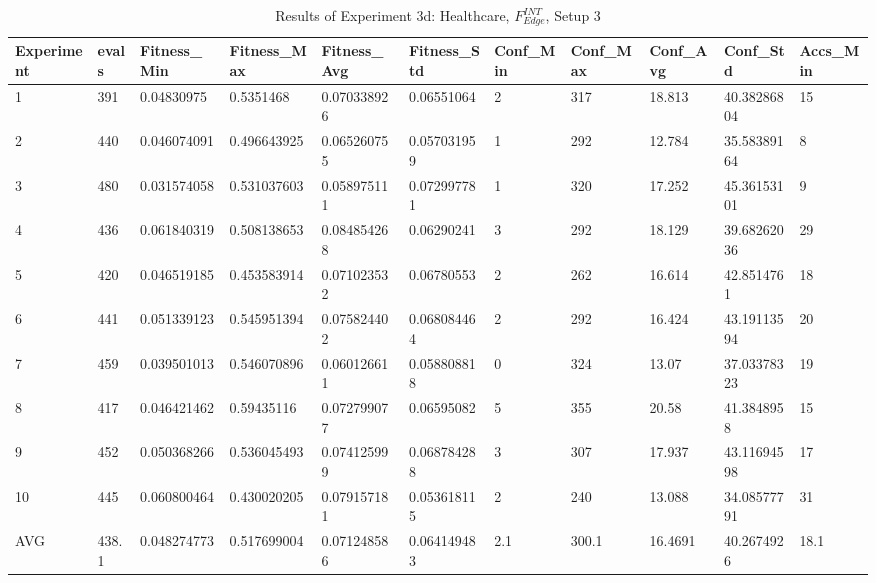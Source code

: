 		\begin{table}[H]
			\caption{Results of Experiment 3d: Healthcare, $F_{Edge}^{INT}$, Setup 3}
			\label{tab:A_Exp3d_Data}
			\begin{adjustbox}{max width=380pt,keepaspectratio,angle=90}
				\begin{tabular}{|l|l|l|l|l|l|l|l|l|l|l|}
					\hline
					\rowcolor[HTML]{EFEFEF} 
					Experiment & evals & Fitness\_Min & Fitness\_Max & Fitness\_Avg & Fitness\_Std & Conf\_Min & Conf\_Max & Conf\_Avg & Conf\_Std   & Accs\_Min \\ \hline
					1          & 391   & 0.04830975   & 0.5351468    & 0.070338926  & 0.06551064   & 2         & 317       & 18.813    & 40.38286804 & 15        \\ \hline
					2          & 440   & 0.046074091  & 0.496643925  & 0.065260755  & 0.057031959  & 1         & 292       & 12.784    & 35.58389164 & 8         \\ \hline
					3          & 480   & 0.031574058  & 0.531037603  & 0.058975111  & 0.072997781  & 1         & 320       & 17.252    & 45.36153101 & 9         \\ \hline
					4          & 436   & 0.061840319  & 0.508138653  & 0.084854268  & 0.06290241   & 3         & 292       & 18.129    & 39.68262036 & 29        \\ \hline
					5          & 420   & 0.046519185  & 0.453583914  & 0.071023532  & 0.06780553   & 2         & 262       & 16.614    & 42.8514761  & 18        \\ \hline
					6          & 441   & 0.051339123  & 0.545951394  & 0.075824402  & 0.068084464  & 2         & 292       & 16.424    & 43.19113594 & 20        \\ \hline
					7          & 459   & 0.039501013  & 0.546070896  & 0.060126611  & 0.058808818  & 0         & 324       & 13.07     & 37.03378323 & 19        \\ \hline
					8          & 417   & 0.046421462  & 0.59435116   & 0.072799077  & 0.06595082   & 5         & 355       & 20.58     & 41.3848958  & 15        \\ \hline
					9          & 452   & 0.050368266  & 0.536045493  & 0.074125999  & 0.068784288  & 3         & 307       & 17.937    & 43.11694598 & 17        \\ \hline
					10         & 445   & 0.060800464  & 0.430020205  & 0.079157181  & 0.053618115  & 2         & 240       & 13.088    & 34.08577791 & 31        \\ \hline
					AVG        & 438.1 & 0.048274773  & 0.517699004  & 0.071248586  & 0.064149483  & 2.1       & 300.1     & 16.4691   & 40.2674926  & 18.1      \\ \hline

\end{tabular}
\end{adjustbox}
\end{table}
